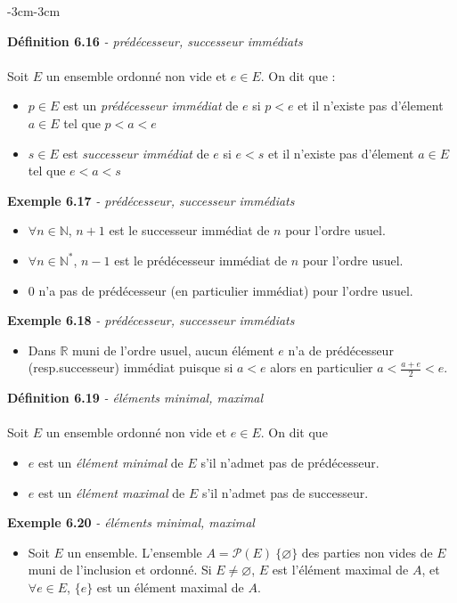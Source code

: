 \documentclass{article}
\newcommand{\notion}[1]{\textcolor{vert_fonce}{\textit{#1}}}
\newenvironment{definition}[2]
{
    \begin{boite_definition}
    \textbf{\textcolor{rouge_fonce}{Définition #1}} \textit{#2} \\ \\
}
{
    \end{boite_definition}
    \vspace{15pt}
}
\newenvironment{exemple}[2]
{
    \begin{boite_exemple}
    \textbf{\textcolor{bleu_fonce}{Exemple #1}} \textit{#2} \\
    \begin{itemize}[label=$\blacktriangleright \quad $]                    
}
{   
    \end{itemize}
    \end{boite_exemple}
    \vspace{15pt}
}
\begin{document}
\begin{adjustwidth}{-3cm}{-3cm}

\begin{definition}{6.16}{- prédécesseur, successeur immédiats}
Soit $E$ un ensemble ordonné non vide et $e \in E$. On dit que :
    \begin{itemize}
        \item $p \in E$ est un \notion{prédécesseur immédiat} de $e$ si $p<e$ et il n'existe pas d'élement $a\in E$ tel que $p<a<e$
        \item $s \in E$ est \notion{successeur  immédiat} de $e$ si $e<s$ et il n'existe pas d'élement $a\in E$ tel que $e<a<s$
    \end{itemize}
\end{definition}

\begin{exemple}{6.17}{- prédécesseur, successeur immédiats}
    \item $\forall n \in \mathbb{N}$, $n+1$ est le successeur immédiat de $n$ pour l'ordre usuel.
    \item $\forall n \in \mathbb{N}^*$, $n-1$ est le prédécesseur immédiat de $n$ pour l'ordre usuel.
    \item $0$ n'a pas de prédécesseur (en particulier immédiat) pour l'ordre usuel.
\end{exemple}


\begin{exemple}{6.18}{- prédécesseur, successeur immédiats}
    \item Dans $\mathbb{R}$ muni de l'ordre usuel, aucun élément $e$ n'a de prédécesseur (resp.successeur) immédiat puisque si $a<e$ alors en particulier $a<\frac{a+e}{2}<e$.
\end{exemple}


\begin{definition}{6.19}{- éléments minimal, maximal}
    Soit $E$ un ensemble ordonné non vide et $e \in E$. On dit que \begin{itemize}
        \item $e$ est un \notion{élément minimal} de $E$ s'il n'admet pas de prédécesseur.
        \item $e$ est un \notion{élément maximal} de $E$ s'il n'admet pas de successeur.
    \end{itemize}

\end{definition}

\begin{exemple}{6.20}{- éléments minimal, maximal}
    \item Soit $E$ un ensemble. L'ensemble $A = \mathcal{P}(E) \ \{\varnothing\}$ des parties non vides de $E$ muni de l'inclusion et ordonné. Si $E \neq \varnothing$, $E$ est l'élément maximal de $A$, et $\forall e \in E$, $\{e\}$ est un élément maximal de $A$.
\end{exemple}


\end{adjustwidth}
\end{document}
